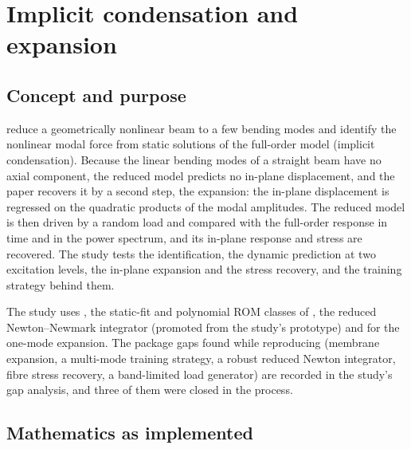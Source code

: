 \section{Implicit condensation and expansion}\label{sec:vf-ice}

\subsection*{Concept and purpose}

\citet{hollkamp2008ice} reduce a geometrically nonlinear beam to a few bending modes and identify the nonlinear modal force from static solutions of the full-order model (implicit condensation). Because the linear bending modes of a straight beam have no axial component, the reduced model predicts no in-plane displacement, and the paper recovers it by a second step, the expansion: the in-plane displacement is regressed on the quadratic products of the modal amplitudes. The reduced model is then driven by a random load and compared with the full-order response in time and in the power spectrum, and its in-plane response and stress are recovered. The study tests the identification, the dynamic prediction at two excitation levels, the in-plane expansion and the stress recovery, and the training strategy behind them.

The study uses , the static-fit and polynomial ROM classes of \rom{}, the reduced Newton--Newmark integrator  (promoted from the study's prototype) and  for the one-mode expansion. The package gaps found while reproducing (membrane expansion, a multi-mode training strategy, a robust reduced Newton integrator, fibre stress recovery, a band-limited load generator) are recorded in the study's gap analysis, and three of them were closed in the process.

\subsection*{Mathematics as implemented}

